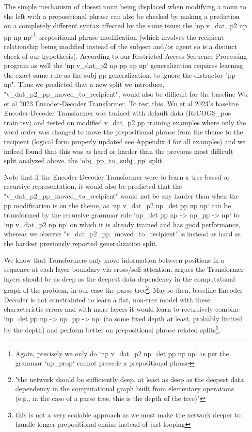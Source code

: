 \documentclass[11pt]{article}
\begin{document}
The simple mechanism of closest noun being displaced when modifying a noun to the left with a prepositional phrase can also be checked by making a prediction on a completely different syntax affected by the same issue: the `np v\_dat\_p2 np pp np np`\footnote{Again, precisely we only do `np v\_dat\_p2 np\_det pp np np` as per the grammar `np\_prop` cannot precede a prepositional phrase} prepositional phrase modification (which involves the recipient relationship being modified instead of the subject and/or agent so is a distinct check of our hypothesis). According to our Restricted Access Sequence Processing program as well the `np v\_dat\_p2 np pp np np` generalization requires learning the exact same rule as the subj pp generalization: to ignore the distractor "pp np". Thus we predicted that a new split we introduce, "v\_dat\_p2\_pp\_moved\_to\_recipient", would also be difficult for the baseline Wu et al 2023 Encoder-Decoder Transformer. To test this, Wu et al 2023's baseline Encoder-Decoder Transformer was trained with default data (ReCOGS\_pos train.tsv) and tested on modified v\_dat\_p2 pp training examples where only the word order was changed to move the prepositional phrase from the theme to the recipient (logical form properly updated see Appendix 4 for all examples) and we indeed found that this was as hard or harder than the previous most difficult split analyzed above, the `obj\_pp\_to\_subj\_pp` split.

Note that if the Encoder-Decoder Transformer were to learn a tree-based or recursive representation, it would also be predicted that the "v\_dat\_p2\_pp\_moved\_to\_recipient" would not be any harder than when the pp modification is on the theme, as `np v\_dat\_p2 np\_det pp np np` can be transformed by the recursive grammar rule `np\_det pp np -> np\_pp -> np` to `np v\_dat\_p2 np np` on which it is already trained and has good performance, whereas we observe "v\_dat\_p2\_pp\_moved\_to\_recipient" is instead as hard as the hardest previously reported generalization split.

We know that Transformers only move information between positions in a sequence at each layer boundary via cross/self-attention. \cite{Csordas2022} argues the Transformer layers should be as deep as the deepest data dependency in the computatonal graph of the problem, in our case the parse tree\footnote{
"the network should be sufficiently deep, at least as deep as the deepest data dependency in the computational graph built from elementary operations (e.g., in the case of a parse tree, this is the depth of the tree)"}. Maybe then, \cite{Wu2023} baseline Encoder-Decoder is not constrainted to learn a flat, non-tree model with these characteristic errors and with more layers it would learn to recursively combine `np\_det pp np -> np\_pp -> np` (to some fixed depth at least, probably limited by the depth) and perform better on prepositional phrase related splits\footnote{this is not a very scalable approach as we must make the network deeper to handle longer prepositional chains instead of just looping}.
\end{document}
